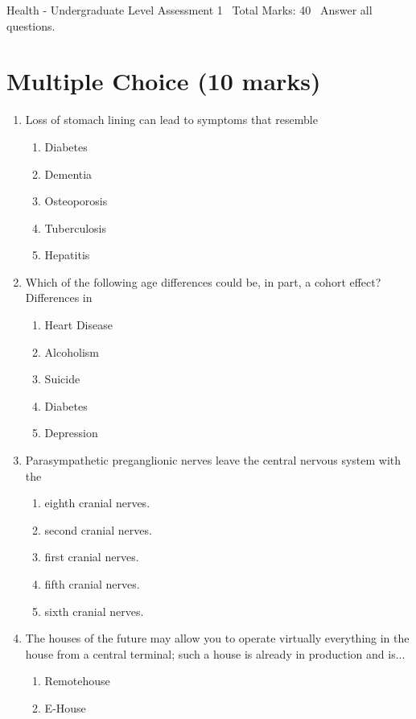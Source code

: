 \documentclass[12pt]{article}
\begin{document}
\begin{center}
Health - Undergraduate Level Assessment 1 \
Total Marks: 40 \
Answer all questions.
\end{center}

\section*{Multiple Choice (10 marks)}
\begin{enumerate}[label=\arabic*.]
\item Loss of stomach lining can lead to symptoms that resemble
\begin{enumerate}[label=(\alph*)]
    \item Diabetes
    \item Dementia
    \item Osteoporosis
    \item Tuberculosis
    \item Hepatitis
\end{enumerate}
\item Which of the following age differences could be, in part, a cohort effect? Differences in
\begin{enumerate}[label=(\alph*)]
    \item Heart Disease
    \item Alcoholism
    \item Suicide
    \item Diabetes
    \item Depression
\end{enumerate}
\item Parasympathetic preganglionic nerves leave the central nervous system with the
\begin{enumerate}[label=(\alph*)]
    \item eighth cranial nerves.
    \item second cranial nerves.
    \item first cranial nerves.
    \item fifth cranial nerves.
    \item sixth cranial nerves.
\end{enumerate}
\item The houses of the future may allow you to operate virtually everything in the house from a central terminal; such a house is already in production and is...
\begin{enumerate}[label=(\alph*)]
    \item Remotehouse
    \item E-House

\end{enumerate}
\end{enumerate}
\end{document}
